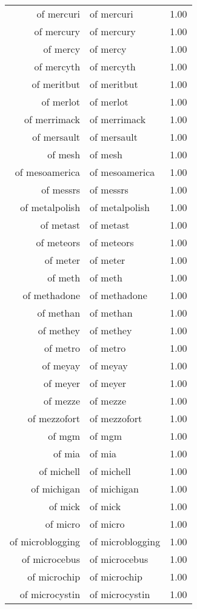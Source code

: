\begin{table}[ht]
\begin{tabular}{rlr}
  of mercuri & of mercuri & 1.00 \\ 
  of mercury & of mercury & 1.00 \\ 
  of mercy & of mercy & 1.00 \\ 
  of mercyth & of mercyth & 1.00 \\ 
  of meritbut & of meritbut & 1.00 \\ 
  of merlot & of merlot & 1.00 \\ 
  of merrimack & of merrimack & 1.00 \\ 
  of mersault & of mersault & 1.00 \\ 
  of mesh & of mesh & 1.00 \\ 
  of mesoamerica & of mesoamerica & 1.00 \\ 
  of messrs & of messrs & 1.00 \\ 
  of metalpolish & of metalpolish & 1.00 \\ 
  of metast & of metast & 1.00 \\ 
  of meteors & of meteors & 1.00 \\ 
  of meter & of meter & 1.00 \\ 
  of meth & of meth & 1.00 \\ 
  of methadone & of methadone & 1.00 \\ 
  of methan & of methan & 1.00 \\ 
  of methey & of methey & 1.00 \\ 
  of metro & of metro & 1.00 \\ 
  of meyay & of meyay & 1.00 \\ 
  of meyer & of meyer & 1.00 \\ 
  of mezze & of mezze & 1.00 \\ 
  of mezzofort & of mezzofort & 1.00 \\ 
  of mgm & of mgm & 1.00 \\ 
  of mia & of mia & 1.00 \\ 
  of michell & of michell & 1.00 \\ 
  of michigan & of michigan & 1.00 \\ 
  of mick & of mick & 1.00 \\ 
  of micro & of micro & 1.00 \\ 
  of microblogging & of microblogging & 1.00 \\ 
  of microcebus & of microcebus & 1.00 \\ 
  of microchip & of microchip & 1.00 \\ 
  of microcystin & of microcystin & 1.00 \\ 

\end{tabular}
\end{table}
